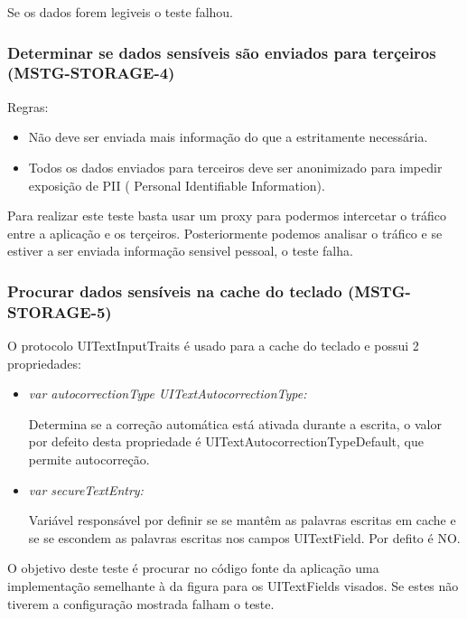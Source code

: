 Se os dados forem legiveis o teste falhou.


\subsubsection{Determinar se dados sensíveis são enviados para terçeiros (MSTG-STORAGE-4)}
\hfill\par
\hfill\par
Regras:
\begin{itemize}
\item Não deve ser enviada mais informação do que a estritamente necessária.
\item Todos os dados enviados para terceiros deve ser anonimizado para impedir exposição de PII (	Personal Identifiable Information).
\end{itemize}
Para realizar este teste basta usar um proxy para podermos intercetar o tráfico entre a aplicação e os terçeiros. Posteriormente podemos analisar o tráfico e se estiver a ser enviada informação sensivel pessoal, o teste falha.



\subsubsection{Procurar dados sensíveis na cache do teclado (MSTG-STORAGE-5)}
\hfill\par
\hfill\par

   O protocolo UITextInputTraits é usado para a cache do teclado e possui 2 propriedades: 
\begin{itemize}

   		\item \textit{var autocorrectionType UITextAutocorrectionType:} 

   			Determina se a correção automática está ativada durante a escrita, o valor por defeito desta propriedade é UITextAutocorrectionTypeDefault, que permite autocorreção. \par
   			\hfill\par

   		\item \textit{var secureTextEntry:}

   			Variável responsável por definir se se mantêm as palavras escritas em cache e se se escondem as palavras escritas nos campos UITextField. Por defito é NO.
\end{itemize}


   	O objetivo deste teste é procurar no código fonte da aplicação uma implementação semelhante à da figura para os UITextFields visados. Se estes não tiverem a configuração mostrada falham o teste.


